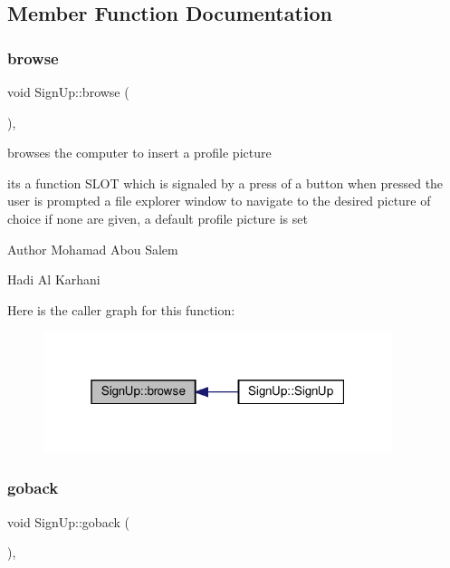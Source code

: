 \subsection{Member Function Documentation}
\mbox{\label{classSignUp_ab35d78276292f7e585b78cb98a5c720a}} 
\subsubsection{\texorpdfstring{browse}{browse}}
{\footnotesize\ttfamily void Sign\+Up\+::browse (\begin{DoxyParamCaption}{ }\end{DoxyParamCaption})\hspace{0.3cm}{\ttfamily [private]}, {\ttfamily [slot]}}



browses the computer to insert a profile picture 

its a function S\+L\+OT which is signaled by a press of a button when pressed the user is prompted a file explorer window to navigate to the desired picture of choice if none are given, a default profile picture is set

\begin{DoxyAuthor}{Author}
Mohamad Abou Salem 

Hadi Al Karhani 
\end{DoxyAuthor}
Here is the caller graph for this function\+:
\nopagebreak
\begin{figure}[H]
\begin{center}
\leavevmode
\includegraphics[width=289pt]{classSignUp_ab35d78276292f7e585b78cb98a5c720a_icgraph}
\end{center}
\end{figure}
\mbox{\label{classSignUp_a1539bfb27c3778d424ebeb4c50210e3d}} 
\subsubsection{\texorpdfstring{goback}{goback}}
{\footnotesize\ttfamily void Sign\+Up\+::goback (\begin{DoxyParamCaption}{ }\end{DoxyParamCaption})\hspace{0.3cm}{\ttfamily [private]}, {\ttfamily [slot]}}



